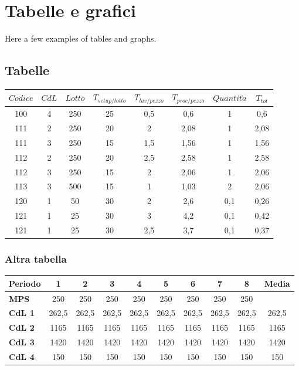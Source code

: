 \section{Tabelle e grafici}
Here a few examples of tables and graphs.
\subsection{Tabelle}
\begin{center}
\begin{tabular}{c c c c c c c c}
\arrayrulecolor{Azzurro}
\hline
{\bfseries $Codice$} & {\bfseries $CdL$} & {\bfseries $Lotto$} & {\bfseries $T_{setup/lotto}$} & {\bfseries $T_{lav/pezzo}$} & {\bfseries $T_{proc/pezzo}$} & {\bfseries$Quantit\grave{a}$} & {\bfseries $T_{tot}$}\\
\hline
100 & 4 & 250 & 25 & 0,5 & 0,6 & 1 & 0,6\\
111 & 2 & 250 & 20 & 2 & 2,08 & 1 & 2,08 \\
111 & 3 & 250 & 15 & 1,5 & 1,56 & 1 & 1,56 \\
112 & 2 & 250 & 20 & 2,5 & 2,58 & 1 & 2,58 \\
112 & 3 & 250 & 15 & 2 & 2,06 & 1 & 2,06\\
113 & 3 & 500 & 15 & 1 & 1,03 & 2 & 2,06\\
120 & 1 & 50 & 30 & 2 & 2,6 & 0,1 & 0,26\\
121 & 1 & 25 & 30 & 3 & 4,2 & 0,1 & 0,42 \\
121 & 1 & 25 & 30 & 2,5 & 3,7 & 0,1 & 0,37 \\
\hline
\end{tabular}
\end{center}

\subsubsection{Altra tabella}
\begin{center}
\begin{tabular}{l c c c c c c c c c}
\arrayrulecolor{Azzurro}
\hline
{\bfseries Periodo} & 1 & 2 & 3 & 4 & 5 & 6 & 7 & 8 & Media\\
\hline
{\bfseries MPS} & 250 & 250 & 250 & 250 & 250 & 250 & 250 & 250 & \\
{\bfseries CdL 1} & 262,5 & 262,5 & 262,5 & 262,5 & 262,5 & 262,5 & 262,5 & 262,5 & 262,5\\
{\bfseries CdL 2} & 1165 & 1165 & 1165 & 1165 & 1165 & 1165 & 1165 & 1165 & 1165\\
{\bfseries CdL 3} & 1420 & 1420 & 1420 & 1420 & 1420 & 1420 & 1420 & 1420 & 1420\\
{\bfseries CdL 4} & 150 & 150 & 150 & 150 & 150 & 150 & 150 & 150 & 150\\
\hline
\end{tabular}
\end{center}

